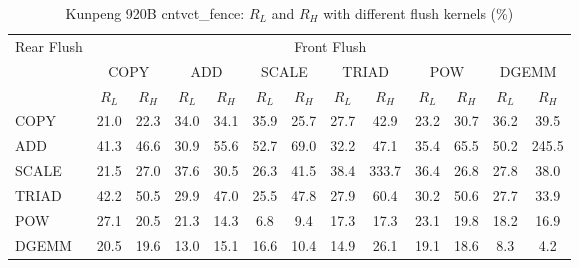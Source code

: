 \begin{table}[htbp]
\centering
\caption{Kunpeng 920B cntvct\_fence: $R_L$ and $R_H$ with different flush kernels (\%)}
\label{tab:frkern-c920bn3-cntvct_fence}
\begin{tabular*}{\textwidth}{@{\extracolsep{\fill}}lcccccccccccc}
\toprule
\multirow{3}{*}{Rear Flush} & \multicolumn{12}{c}{Front Flush} \\ \cmidrule(lr){2-13}
& \multicolumn{2}{c}{COPY} & \multicolumn{2}{c}{ADD} & \multicolumn{2}{c}{SCALE} & \multicolumn{2}{c}{TRIAD} & \multicolumn{2}{c}{POW} & \multicolumn{2}{c}{DGEMM} \\ \cmidrule(lr){2-3} \cmidrule(lr){4-5} \cmidrule(lr){6-7} \cmidrule(lr){8-9} \cmidrule(lr){10-11} \cmidrule(lr){12-13}
& $R_L$ & $R_H$ & $R_L$ & $R_H$ & $R_L$ & $R_H$ & $R_L$ & $R_H$ & $R_L$ & $R_H$ & $R_L$ & $R_H$ \\ \midrule
COPY & 21.0 & 22.3 & 34.0 & 34.1 & 35.9 & 25.7 & 27.7 & 42.9 & 23.2 & 30.7 & 36.2 & 39.5 \\
ADD & 41.3 & 46.6 & 30.9 & 55.6 & 52.7 & 69.0 & 32.2 & 47.1 & 35.4 & 65.5 & 50.2 & 245.5 \\
SCALE & 21.5 & 27.0 & 37.6 & 30.5 & 26.3 & 41.5 & 38.4 & 333.7 & 36.4 & 26.8 & 27.8 & 38.0 \\
TRIAD & 42.2 & 50.5 & 29.9 & 47.0 & 25.5 & 47.8 & 27.9 & 60.4 & 30.2 & 50.6 & 27.7 & 33.9 \\
POW & 27.1 & 20.5 & 21.3 & 14.3 & 6.8 & 9.4 & 17.3 & 17.3 & 23.1 & 19.8 & 18.2 & 16.9 \\
DGEMM & 20.5 & 19.6 & 13.0 & 15.1 & 16.6 & 10.4 & 14.9 & 26.1 & 19.1 & 18.6 & 8.3 & 4.2 \\
\bottomrule
\end{tabular*}
\end{table}